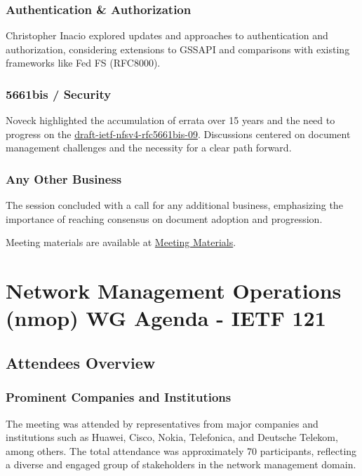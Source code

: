 \documentclass{article}
\begin{document}
\subsubsection{Authentication \& Authorization}
Christopher Inacio explored updates and approaches to authentication and authorization, considering extensions to GSSAPI and comparisons with existing frameworks like Fed FS (RFC8000).

\subsubsection{5661bis / Security}
Noveck highlighted the accumulation of errata over 15 years and the need to progress on the \href{https://datatracker.ietf.org/doc/html/draft-ietf-nfsv4-rfc5661bis-09}{draft-ietf-nfsv4-rfc5661bis-09}. Discussions centered on document management challenges and the necessity for a clear path forward.

\subsubsection{Any Other Business}
The session concluded with a call for any additional business, emphasizing the importance of reaching consensus on document adoption and progression.

Meeting materials are available at \href{https://example.com/meeting-materials}{Meeting Materials}.



\newpage

\section{Network Management Operations (nmop) WG Agenda - IETF 121}

\subsection{Attendees Overview}
\subsubsection{Prominent Companies and Institutions}
The meeting was attended by representatives from major companies and institutions such as Huawei, Cisco, Nokia, Telefonica, and Deutsche Telekom, among others. The total attendance was approximately 70 participants, reflecting a diverse and engaged group of stakeholders in the network management domain.
\end{document}
